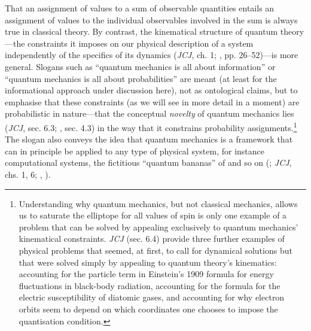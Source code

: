 \documentclass[12pt,english,twoside]{article}
\numberwithin{equation}{section}
\begin{document}
That an assignment of values to a sum of observable quantities entails an assignment of values to the individual observables involved in the sum is always true in classical theory. By contrast, the kinematical structure of quantum theory---the constraints it imposes on our physical description of a system independently of the specifics of its dynamics (\emph{JCJ}, ch. 1; \citealt{janssen2009}, pp. 26--52)---is more general. Slogans such as ``quantum mechanics is all about information'' or ``quantum mechanics is all about probabilities'' are meant (at least for the informational approach under discussion here), not as ontological claims, but to emphasise that these constraints (as we will see in more detail in a moment) are probabilistic in nature---that the conceptual \emph{novelty} of quantum mechanics lies (\emph{JCJ}, sec. 6.3; \citealt{demopoulosOnTheories}, sec. 4.3) in the way that it constrains probability assignments.\footnote{Understanding why quantum mechanics, but not classical mechanics, allows us to saturate the elliptope for all values of spin is only one example of a problem that can be solved by appealing exclusively to quantum mechanics' kinematical constraints. \emph{JCJ} (sec. 6.4) provide three further examples of physical problems that seemed, at first, to call for dynamical solutions but that were solved simply by appealing to quantum theory's kinematics: accounting for the particle term in Einstein's 1909 formula for energy fluctuations in black-body radiation, accounting for the formula for the electric susceptibility of diatomic gases, and accounting for why electron orbits seem to depend on which coordinates one chooses to impose the quantisation condition.} The slogan also conveys the idea that quantum mechanics is a framework that can in principle be applied to any type of physical system, for instance computational systems, the fictitious ``quantum bananas'' of \citet[]{bub2016} and so on (\citealt{aaronson2013}; \emph{JCJ}, chs. 1, 6; \citealt{nielsenChuang2000}, \citealt{wallace2019}).
\end{document}

